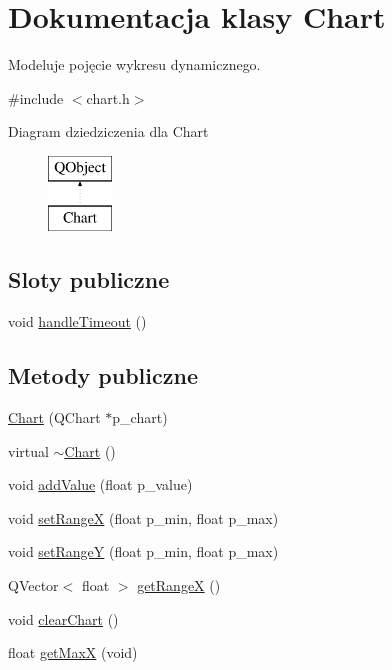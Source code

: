 \hypertarget{class_chart}{}\section{Dokumentacja klasy Chart}
\label{class_chart}


Modeluje pojęcie wykresu dynamicznego.  




{\ttfamily \#include $<$chart.\+h$>$}

Diagram dziedziczenia dla Chart\begin{figure}[H]
\begin{center}
\leavevmode
\includegraphics[height=2.000000cm]{class_chart}
\end{center}
\end{figure}
\subsection*{Sloty publiczne}
\begin{DoxyCompactItemize}
\item 
void \hyperlink{class_chart_aba07859ccb2630218a1e1d7b90c3f38c}{handle\+Timeout} ()
\end{DoxyCompactItemize}
\subsection*{Metody publiczne}
\begin{DoxyCompactItemize}
\item 
\hyperlink{class_chart_a2048aeb5666281b3e8feb4bef3ce9c11}{Chart} (Q\+Chart $\ast$p\+\_\+chart)
\item 
virtual \hyperlink{class_chart_a8a593f9f79c94057718d1c4942e77f86}{$\sim$\+Chart} ()
\item 
void \hyperlink{class_chart_a3df426b79930e71f41f6177a0d08c3b2}{add\+Value} (float p\+\_\+value)
\item 
void \hyperlink{class_chart_ad7cb4c524b68425320c7724c6152d4fa}{set\+RangeX} (float p\+\_\+min, float p\+\_\+max)
\item 
void \hyperlink{class_chart_afa8b1c978f21659710aa09bbe4a5b828}{set\+RangeY} (float p\+\_\+min, float p\+\_\+max)
\item 
Q\+Vector$<$ float $>$ \hyperlink{class_chart_a741501f212ff1828286dbbe1bad94afd}{get\+RangeX} ()
\item 
void \hyperlink{class_chart_ab9504951fa7890ec4a2973e0cbf877d5}{clear\+Chart} ()
\item 
float \hyperlink{class_chart_aad8f606404a17c00bba777753203be7c}{get\+MaxX} (void)
\end{DoxyCompactItemize}
